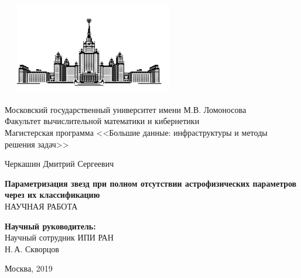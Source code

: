 \documentclass[12pt, a4paper]{article}
\begin{document}
\begin{titlepage}
\begin{center}
\includegraphics[width=8cm, height=4cm]{MSU}
\end{center}
\begin{center}
Московский государственный университет имени М.В. Ломоносова\\
\vspace{0.1 cm}
Факультет вычислительной математики и кибернетики\\
\vspace{0.1 cm}
Магистерская программа <<Большие данные: инфраструктуры и методы решения задач>>

\vspace{3cm}
{\Large Черкашин Дмитрий Сергеевич }\\
\vspace{1cm}

{\bf\LARGE Параметризация звезд при полном отсутствии астрофизических параметров через их классификацию}\\ \vspace{2cm}
НАУЧНАЯ РАБОТА

\end{center}
\vspace{2cm}
\begin{flushright}

{\bf Научный руководитель:}\\
Научный сотрудник ИПИ РАН\\
Н.\,А. Скворцов

\end{flushright}

 \vspace{4.5cm}

\centerline {Москва, 2019}

\end{titlepage}
\newpage
\setcounter{page}{2}
\tableofcontents
\newpage
\end{document}

